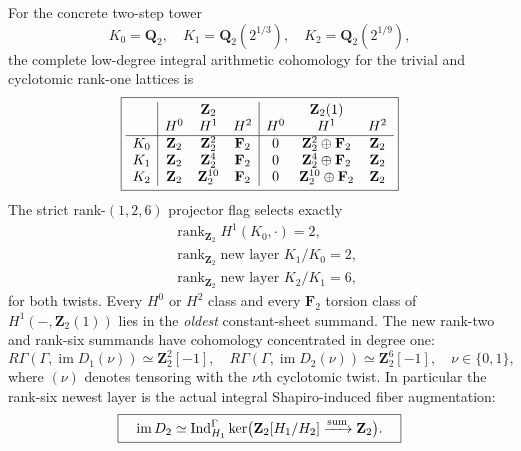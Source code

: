 \begin{corollary}
\label{cor:dyadic-f135-nine-arithmetic-ledger}
For the concrete
two-step tower
\[
K_0=\mathbf Q_2,\quad
K_1=\mathbf Q_2(2^{1/3}),\quad
K_2=\mathbf Q_2(2^{1/9}),
\]
the complete
low-degree
integral
arithmetic
cohomology
for the trivial
and cyclotomic
rank-one
lattices is
\begin{equation}\label{eq:dyadic-f135-nine-h0h1h2-ledgers}
\boxed{
\begin{array}{c|ccc|ccc}
&\multicolumn{3}{c|}{\mathbf Z_2}
&\multicolumn{3}{c}{\mathbf Z_2(1)}\\
& H^0&H^1&H^2&H^0&H^1&H^2\\ \hline
K_0&
\mathbf Z_2&
\mathbf Z_2^2&
\mathbf F_2&
0&\mathbf Z_2^2\oplus\mathbf F_2&\mathbf Z_2\\
K_1&
\mathbf Z_2&
\mathbf Z_2^4&
\mathbf F_2&
0&\mathbf Z_2^4\oplus\mathbf F_2&\mathbf Z_2\\
K_2&
\mathbf Z_2&
\mathbf Z_2^{10}&
\mathbf F_2&
0&\mathbf Z_2^{10}\oplus\mathbf F_2&\mathbf Z_2
\end{array}}
\end{equation}
The
strict
rank-$(1,2,6)$
projector flag
selects
exactly
\[
\begin{aligned}
&\operatorname{rank}_{\mathbf Z_2}
H^1(K_0,\cdot)=2,\\
&\operatorname{rank}_{\mathbf Z_2}
\text{new layer }K_1/K_0=2,\\
&\operatorname{rank}_{\mathbf Z_2}
\text{new layer }K_2/K_1=6,
\end{aligned}
\]
for both twists.
Every $H^0$
or $H^2$
class and
every
$\mathbf F_2$
torsion class
of
$H^1(-,\mathbf Z_2(1))$
lies in the
\emph{oldest}
constant-sheet
summand.
The new
rank-two and
rank-six
summands have
cohomology
concentrated
in degree one:
\begin{equation}\label{eq:dyadic-f135-new-layer-degree-one-only}
\boxed{
R\Gamma(\Gamma,\operatorname{im}D_1(\nu))
\simeq\mathbf Z_2^2[-1],
\quad
R\Gamma(\Gamma,\operatorname{im}D_2(\nu))
\simeq\mathbf Z_2^6[-1],
\quad
\nu\in\{0,1\},
}
\end{equation}
where $(\nu)$
denotes tensoring
with the
$\nu$th
cyclotomic twist.
In particular
the rank-six
newest layer
is the actual
integral
Shapiro-induced
fiber augmentation:
\begin{equation}\label{eq:dyadic-f135-new-six-layer-induction}
\boxed{\quad
\operatorname{im}D_2
\simeq
\operatorname{Ind}_{H_1}^\Gamma
\ker\bigl(
\mathbf Z_2[H_1/H_2]
\xrightarrow{\rm sum}
\mathbf Z_2
\bigr).
\quad}
\end{equation}
\end{corollary}

